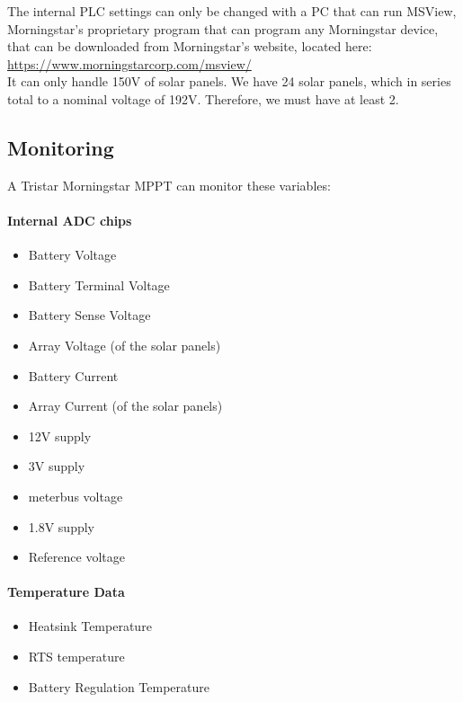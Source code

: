 The internal PLC settings can only be changed with a PC that can run MSView, Morningstar’s proprietary program that can program any Morningstar device, that can be downloaded from Morningstar’s website, located here:\\

\href{https://www.morningstarcorp.com/msview/}{https://www.morningstarcorp.com/msview/}\\

It can only handle 150V of solar panels. We have 24 solar panels, which in series total to a nominal voltage of 192V. Therefore, we must have at least 2.


\subsection{Monitoring}

A Tristar Morningstar MPPT can monitor these variables:

\paragraph{Internal ADC chips}


\begin{itemize}
	\item Battery Voltage
	\item Battery Terminal Voltage
	\item Battery Sense Voltage
	\item Array Voltage (of the solar panels)
	\item Battery Current
	\item Array Current (of the solar panels)
	\item 12V supply
	\item 3V supply
	\item meterbus voltage
	\item 1.8V supply
	\item Reference voltage
\end{itemize}
\par
\paragraph{Temperature Data}
\begin{itemize}
	\item Heatsink Temperature
	\item RTS temperature
	\item Battery Regulation Temperature
\end{itemize}
\par 

